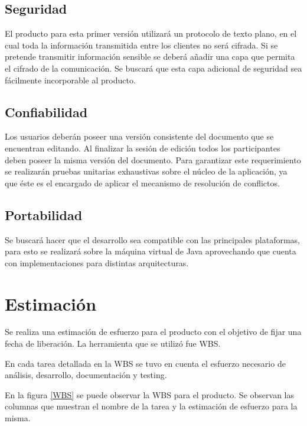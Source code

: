 \documentclass[12pt,a4paper]{article}
\begin{document}
\subsection{Seguridad} El producto para esta primer versión utilizará un protocolo de texto plano, en el cual toda la información transmitida entre los clientes no será cifrada. Si se pretende transmitir información sensible se deberá añadir una capa que permita el cifrado de la comunicación. Se buscará que esta capa adicional de seguridad sea fácilmente incorporable al producto.

\subsection{Confiabilidad} Los usuarios deberán poseer una versión consistente del documento que se encuentran editando. Al finalizar la sesión de edición todos los participantes deben poseer la misma versión del documento. Para garantizar este requerimiento se realizarán pruebas unitarias exhaustivas sobre el núcleo de la aplicación, ya que éste es el encargado de aplicar el mecanismo de resolución de conflictos.

\subsection{Portabilidad} Se buscará hacer que el desarrollo sea compatible con las principales plataformas, para esto se realizará sobre la máquina virtual de Java aprovechando que cuenta con implementaciones para distintas arquitecturas.	

	\section{Estimación}

	Se realiza una estimación de esfuerzo para el producto con el objetivo de fijar una fecha de liberación. La herramienta que se utilizó fue WBS.

	En cada tarea detallada en la WBS se tuvo en cuenta el esfuerzo necesario de análisis, desarrollo, documentación y testing.

	En la figura \ref{WBS} se puede observar la WBS para el producto. Se observan las columnas que muestran el nombre de la tarea y la estimación de esfuerzo para la misma.
\end{document}
